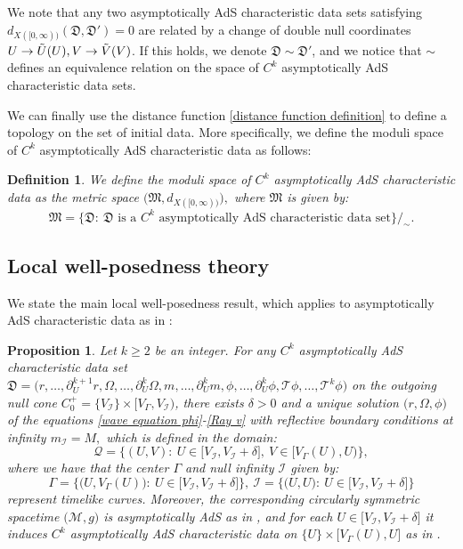 \documentclass[11pt]{article}
\newtheorem{definition}{Definition}[section]
\newtheorem{proposition}{Proposition}[section]
\numberwithin{equation}{section}
\begin{document}
We note that any two asymptotically AdS characteristic data sets satisfying $d_{X([0,\infty))}(\mathfrak{D},\mathfrak{D}')=0$ are related by a change of double null coordinates $U\rightarrow\Tilde{U}(U), V\rightarrow\Tilde{V}(V)$. If this holds, we denote  $\mathfrak{D}\sim\mathfrak{D}'$, and we notice that $\sim$ defines an equivalence relation on the space of $C^k$ asymptotically AdS characteristic data sets.

We can finally use the distance function \eqref{distance function definition} to define a topology on the set of initial data. More specifically, we define the moduli space of $C^k$ asymptotically AdS characteristic data as follows:
\begin{definition}\label{moduli space definition}
    We define the moduli space of $C^k$ asymptotically AdS characteristic data as the metric space $\big(\mathfrak{M},d_{X([0,\infty))}\big),$ where $\mathfrak{M}$ is given by:
\[\mathfrak{M}=\big\{\mathfrak{D}:\ \mathfrak{D}\text{ is a } C^k \text{ asymptotically AdS characteristic data set}\big\}/_{\sim}.\]
\end{definition}


\subsection{Local well-posedness theory}\label{well posedness section}
We state the main local well-posedness result, which applies to asymptotically AdS characteristic data as in :
\begin{proposition}\label{lwp proposition}
    Let $k\geq2$ be an integer. 
    For any $C^{k}$ asymptotically AdS characteristic data set $\mathfrak{D}=\big(r,\ldots,\partial_U^{k+1}r,\Omega,\ldots,\partial_U^k\Omega,m,\ldots,\partial_U^km,\phi,\ldots,\partial_U^k\phi,\mathcal{T}\phi,\ldots,\mathcal{T}^k\phi\big)$ on the outgoing null cone $C_0^+=\big\{V_{\mathcal{I}}\big\}\times\big[V_{\Gamma},V_{\mathcal{I}}\big)$, there exists $\delta>0$ and a unique solution $\big(r,\Omega,\phi\big)$ of the equations \eqref{wave equation phi}-\eqref{Ray v} with reflective boundary conditions at infinity $m_{\mathcal{I}}=M,$ which is defined in the domain:
    \[\mathcal{Q}=\Big\{(U,V):\ U\in\big[V_{\mathcal{I}},V_{\mathcal{I}}+\delta\big],\ V\in\big[V_{\Gamma}(U),U\big)\Big\},\]
    where we have that the center $\Gamma$ and null infinity $\mathcal{I}$ given by:
    \[\Gamma=\Big\{\big(U,V_{\Gamma}(U)\big):\ U\in\big[V_{\mathcal{I}},V_{\mathcal{I}}+\delta\big]\Big\},\ \mathcal{I}=\Big\{\big(U,U\big):\ U\in\big[V_{\mathcal{I}},V_{\mathcal{I}}+\delta\big]\Big\}\]
    represent timelike curves. Moreover, the corresponding circularly symmetric spacetime $\big(\mathcal{M},g\big)$ is asymptotically AdS as in , and for each $U\in\big[V_{\mathcal{I}},V_{\mathcal{I}}+\delta\big]$ it induces $C^{k}$ asymptotically AdS  characteristic data on $\big\{U\big\}\times\big[V_{\Gamma}(U),U\big]$ as in .
\end{proposition}
\end{document}
